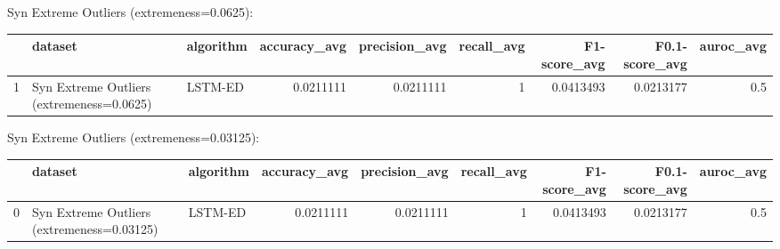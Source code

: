 Syn Extreme Outliers (extremeness=0.0625):

\begin{tabular}{rllrrrrrr}
\hline
    & dataset                                   & algorithm   &   accuracy\_avg &   precision\_avg &   recall\_avg &   F1-score\_avg &   F0.1-score\_avg &   auroc\_avg \\
\hline
  1 & Syn Extreme Outliers (extremeness=0.0625) & LSTM-ED     &      0.0211111 &       0.0211111 &            1 &      0.0413493 &        0.0213177 &         0.5 \\
\hline
\end{tabular}

Syn Extreme Outliers (extremeness=0.03125):

\begin{tabular}{rllrrrrrr}
\hline
    & dataset                                    & algorithm   &   accuracy\_avg &   precision\_avg &   recall\_avg &   F1-score\_avg &   F0.1-score\_avg &   auroc\_avg \\
\hline
  0 & Syn Extreme Outliers (extremeness=0.03125) & LSTM-ED     &      0.0211111 &       0.0211111 &            1 &      0.0413493 &        0.0213177 &         0.5 \\
\hline
\end{tabular}

